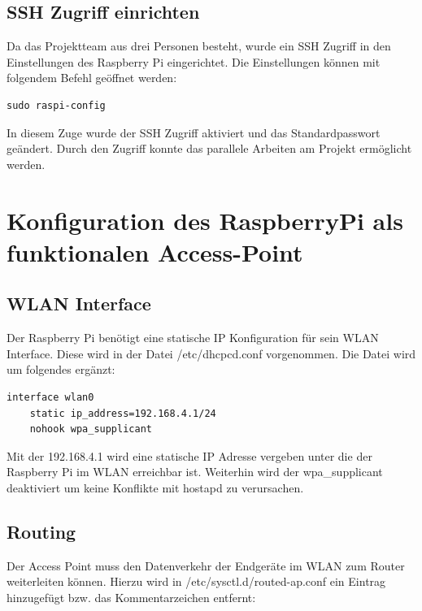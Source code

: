 \documentclass[a4paper,11pt,singlespacing]{article}
\begin{document}
    	
    	\subsection{SSH Zugriff einrichten}
    	Da das Projektteam aus drei Personen besteht, wurde ein SSH Zugriff in den Einstellungen des Raspberry Pi eingerichtet. Die Einstellungen können mit folgendem Befehl geöffnet werden: 
        \begin{lstlisting}
sudo raspi-config
        \end{lstlisting} 
    	
        In diesem Zuge wurde der SSH Zugriff aktiviert und das Standardpasswort geändert. Durch den  Zugriff konnte das parallele Arbeiten am Projekt ermöglicht werden. 
    	\section{Konfiguration des RaspberryPi als funktionalen Access-Point}
            \subsection{WLAN Interface}
                Der Raspberry Pi benötigt eine statische IP Konfiguration für sein WLAN Interface. Diese wird in der Datei /etc/dhcpcd.conf vorgenommen. Die Datei wird um folgendes ergänzt:\\
                \lstset{
                language=bash,
                }
                \begin{lstlisting}
interface wlan0
    static ip_address=192.168.4.1/24
    nohook wpa_supplicant
                \end{lstlisting} 
                Mit der 192.168.4.1 wird eine statische IP Adresse vergeben unter die der Raspberry Pi im WLAN erreichbar ist. Weiterhin wird der wpa{\_}supplicant deaktiviert um keine Konflikte mit hostapd zu verursachen. 
            
            \subsection{Routing}
                Der Access Point muss den Datenverkehr der Endgeräte im WLAN zum Router weiterleiten können.
                Hierzu wird in /etc/sysctl.d/routed-ap.conf ein Eintrag hinzugefügt bzw. das Kommentarzeichen entfernt:\\
                \lstset{
                language=bash,
                }
\end{document}
